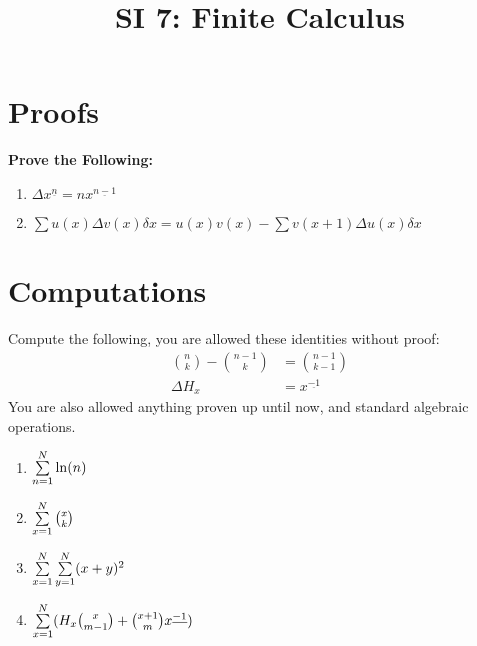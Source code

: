 \documentclass[12pt]{article}
\date{}
\author{}
\title{SI 7: Finite Calculus}
\begin{document}
	\maketitle
	\section{Proofs}
	\textbf{Prove the Following:}
	\begin{enumerate}
		\item $\Delta x^{\underline{n}} = nx^{\underline{n-1}}$
		\item $\sum u(x)\Delta v(x) \delta x = u(x)v(x) - \sum v(x+1)\Delta u(x)\delta x$
	\end{enumerate}
	\section{Computations}
	Compute the following, you are allowed these identities without proof:
	\begin{align}
		{n\choose k} - {{n-1}\choose k} &= {{n-1} \choose {k-1}}\\[.1in]
		\Delta H_x &= x^{\underline{-1}}
	\end{align}
	You are also allowed anything proven up until now, and standard algebraic operations.
	
	\begin{enumerate}[resume]
		\item $\sum^N_{n=1}\limits \ln (n)$
		\item $\sum^{N}_{x=1}\limits {x\choose k}$
		\item $\sum^N_{x=1}\limits\sum^N_{y=1}\limits(x+y)^2$
		\item $\sum^N_{x=1}\limits(H_x {x\choose{m-1}}+{{x+1}\choose m}x^{\underline{-1}})$
	\end{enumerate}
\end{document}
